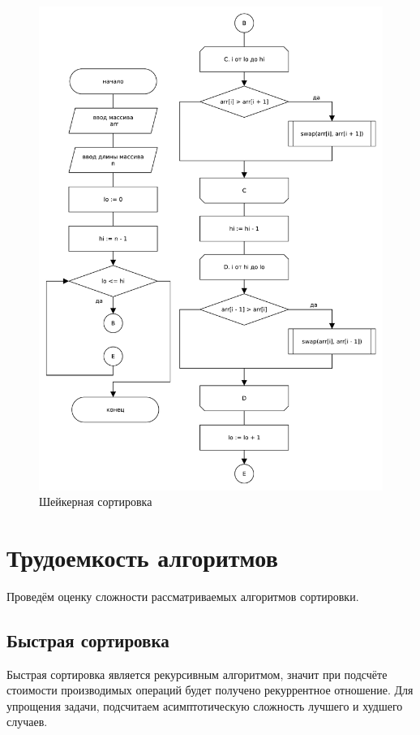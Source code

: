 \begin{figure}[H]
    \centering
    \includegraphics[scale=0.65]{./pdf/shakersort.pdf}
    \caption{Шейкерная сортировка}
    \label{img:shs}
\end{figure}

\section{Трудоемкость алгоритмов}
Проведём оценку сложности рассматриваемых алгоритмов сортировки.

\subsection{Быстрая сортировка}
Быстрая сортировка является рекурсивным алгоритмом, значит при подсчёте стоимости производимых операций будет получено рекуррентное отношение. Для упрощения задачи, подсчитаем асимптотическую сложность лучшего и худшего случаев.

